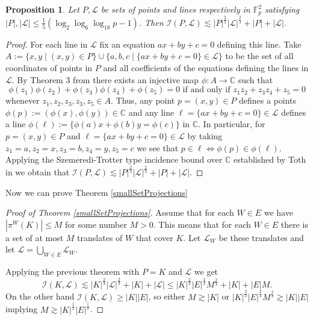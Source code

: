 \documentclass{amsart}
\newtheorem{proposition}[theorem]{Proposition}
\newcommand{\F}{\mathbb F}
\begin{document}
\begin{proposition}
    Let $P, \mathcal{L}$ be sets of points and lines respectively in $\F_p^2$ satisfying $|P|, |\mathcal{L}| \leq \frac{1}{5}(\log_2 \log_6 \log_{18} p - 1)$. Then $\mathcal{I}(P, \mathcal{L}) \lesssim |P|^{\frac{2}{3}}|\mathcal{L}|^\frac{2}{3} + |P| + |\mathcal{L}|$.   
\end{proposition}
\begin{proof}
    For each line in $\mathcal{L}$ fix an equation $ax + by + c = 0$ defining this line. Take $A := \{ x, y \mid (x, y) \in P\} \cup \{a, b, c \mid \{ax + by + c = 0\} \in \mathcal{L}\}$ to be the set of all coordinates of points in $P$ and all coefficients of the equations defining the lines in $\mathcal{L}$. By Theorem 3 from \cite{Gro13} there exists an injective map $\phi: A \to \mathbb{C}$ such that $$\phi(z_1) \phi(z_2) + \phi(z_3)\phi(z_4) + \phi(z_5) = 0 \text{ if and only if } z_1 z_2 + z_3 z_4 + z_5 = 0$$ whenever $z_1, z_2, z_3, z_3, z_5 \in A$. Thus, any point $p = (x, y) \in P$ defines a points $\phi(p) := (\phi(x), \phi(y)) \in \mathbb{C}$ and any line $\ell = \{ax + by + c = 0\} \in \mathcal{L}$ defines a line $\phi(\ell) := \{\phi(a)x + \phi(b)y = \phi(c)\}$ in $\mathbb{C}$. In particular, for $p = (x, y) \in P$ and $\ell = \{ax + by  + c = 0\} \in \mathcal{L}$  by taking $z_1 = a, z_2 = x, z_3 = b, z_4 = y, z_5 = c$ we see that $p \in \ell \Leftrightarrow \phi(p) \in \phi(\ell)$. Applying the Szemeredi-Trotter type incidence bound over $\mathbb{C}$ established by Toth in \cite{Tot03} we obtain that $\mathcal{I}(P, \mathcal{L}) \lesssim |P|^{\frac{2}{3}}|\mathcal{L}|^\frac{2}{3} + |P| + |\mathcal{L}|$.
\end{proof}

Now we can prove Theorem \ref{smallSetProjections}

\begin{proof}[Proof of Theorem \ref{smallSetProjections}]
    Assume that for each $W \in E$ we have $|\pi^W(K)| \leq M$ for some number $M > 0$. This means that for each $W \in E$ there is a set of at most $M$ translates of $W$ that cover $K$. Let $\mathcal{L}_W$ be these translates and let $\mathcal{L} = \bigcup_{W \in E} \mathcal{L}_W$. 
    
    Applying the previous theorem with $P = K$ and $\mathcal{L}$ we get $$\mathcal{I}(K, \mathcal{L}) \lesssim |K|^\frac{2}{3}|\mathcal{L}|^\frac{2}{3} + |K| + |\mathcal{L}| \leq  |K|^\frac{2}{3}|E|^\frac{2}{3}M^\frac{2}{3} + |K| + |E|M.$$ On the other hand $\mathcal{I}(K, \mathcal{L}) \geq |K||E|$, so either $M \gtrsim |K|$ or $|K|^\frac{2}{3}|E|^\frac{2}{3}M^\frac{2}{3} \gtrsim |K||E|$ implying $M \gtrsim |K|^\frac{1}{2} |E|^\frac{1}{2}$.
\end{proof}
\end{document}
